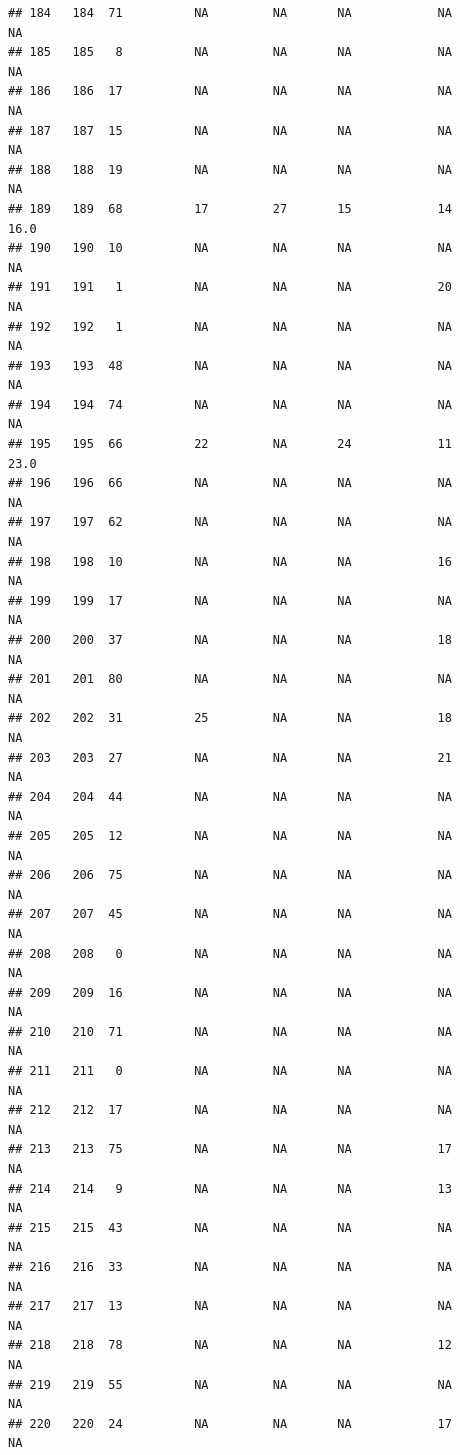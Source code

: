\documentclass[man]{apa6}
\begin{document}
\begin{verbatim}
## 184   184  71          NA         NA       NA            NA       NA
## 185   185   8          NA         NA       NA            NA       NA
## 186   186  17          NA         NA       NA            NA       NA
## 187   187  15          NA         NA       NA            NA       NA
## 188   188  19          NA         NA       NA            NA       NA
## 189   189  68          17         27       15            14     16.0
## 190   190  10          NA         NA       NA            NA       NA
## 191   191   1          NA         NA       NA            20       NA
## 192   192   1          NA         NA       NA            NA       NA
## 193   193  48          NA         NA       NA            NA       NA
## 194   194  74          NA         NA       NA            NA       NA
## 195   195  66          22         NA       24            11     23.0
## 196   196  66          NA         NA       NA            NA       NA
## 197   197  62          NA         NA       NA            NA       NA
## 198   198  10          NA         NA       NA            16       NA
## 199   199  17          NA         NA       NA            NA       NA
## 200   200  37          NA         NA       NA            18       NA
## 201   201  80          NA         NA       NA            NA       NA
## 202   202  31          25         NA       NA            18       NA
## 203   203  27          NA         NA       NA            21       NA
## 204   204  44          NA         NA       NA            NA       NA
## 205   205  12          NA         NA       NA            NA       NA
## 206   206  75          NA         NA       NA            NA       NA
## 207   207  45          NA         NA       NA            NA       NA
## 208   208   0          NA         NA       NA            NA       NA
## 209   209  16          NA         NA       NA            NA       NA
## 210   210  71          NA         NA       NA            NA       NA
## 211   211   0          NA         NA       NA            NA       NA
## 212   212  17          NA         NA       NA            NA       NA
## 213   213  75          NA         NA       NA            17       NA
## 214   214   9          NA         NA       NA            13       NA
## 215   215  43          NA         NA       NA            NA       NA
## 216   216  33          NA         NA       NA            NA       NA
## 217   217  13          NA         NA       NA            NA       NA
## 218   218  78          NA         NA       NA            12       NA
## 219   219  55          NA         NA       NA            NA       NA
## 220   220  24          NA         NA       NA            17       NA

\end{verbatim}
\end{document}
